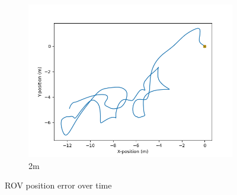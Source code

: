 \documentclass[class=article, crop=false]{standalone}
\begin{document}
\begin{figure}
\begin{subfigure}[b]{0.48\textwidth}
        \includegraphics{scenario1/rov-50m/2.0m/usv_position_controlled}
        \caption{2m}
        \label{}
    \end{subfigure}

    \caption{ROV position error over time}
\end{figure}
\end{document}
